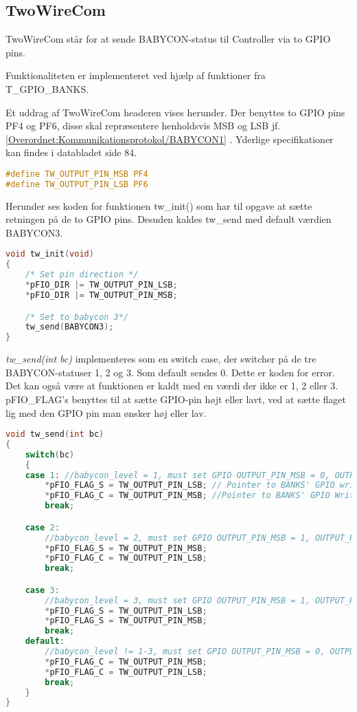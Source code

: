 \subsection*{TwoWireCom}
TwoWireCom står for at sende BABYCON-status til Controller via to GPIO pins. 

Funktionaliteten er implementeret ved hjælp af funktioner fra T\_GPIO\_BANKS. 

Et uddrag af TwoWireCom headeren vises herunder.
Der benyttes to GPIO pins PF4 og PF6, disse skal repræsentere henholdsvis MSB og LSB jf. \ref{Overordnet:Kommunikationsprotokol/BABYCON1} . Yderlige specifikationer kan findes i databladet \citep{AD1836} side 84. 

\begin{lstlisting}[language=C,numbers=none]
#define TW_OUTPUT_PIN_MSB PF4
#define TW_OUTPUT_PIN_LSB PF6
\end{lstlisting}

Herunder ses koden for funktionen tw\_init() som har til opgave at sætte retningen på de to GPIO pins. Desuden kaldes tw\_send med default værdien BABYCON3. 
\begin{lstlisting}[language=C,numbers=none]
void tw_init(void)
{
    /* Set pin direction */
    *pFIO_DIR |= TW_OUTPUT_PIN_LSB;
    *pFIO_DIR |= TW_OUTPUT_PIN_MSB;

    /* Set to babycon 3*/
    tw_send(BABYCON3);
}
\end{lstlisting}

\textit{tw\_send(int bc)} implementeres som en switch case, der switcher på de tre BABYCON-statuser 1, 2 og 3. Som default sendes 0. Dette er koden for error. Det kan også være at funktionen er kaldt med en værdi der ikke er 1, 2 eller 3.  
pFIO\_FLAG's benyttes til at sætte GPIO-pin højt eller lavt, ved at sætte flaget lig med den GPIO pin man ønsker høj eller lav. 

\begin{lstlisting}[language=C,numbers=none]
void tw_send(int bc)
{
    switch(bc)
    {
    case 1:	//babycon_level = 1, must set GPIO OUTPUT_PIN_MSB = 0, OUTPUT_PIN_LSB = 1.
        *pFIO_FLAG_S = TW_OUTPUT_PIN_LSB; // Pointer to BANKS' GPIO write to set register (Set high)
        *pFIO_FLAG_C = TW_OUTPUT_PIN_MSB; //Pointer to BANKS' GPIO Write to Clear register (set low)
        break;

    case 2:
        //babycon_level = 2, must set GPIO OUTPUT_PIN_MSB = 1, OUTPUT_PIN_LSB = 0.
        *pFIO_FLAG_S = TW_OUTPUT_PIN_MSB;
        *pFIO_FLAG_C = TW_OUTPUT_PIN_LSB;
        break;

    case 3:
        //babycon_level = 3, must set GPIO OUTPUT_PIN_MSB = 1, OUTPUT_PIN_LSB = 1.
        *pFIO_FLAG_S = TW_OUTPUT_PIN_LSB;
        *pFIO_FLAG_S = TW_OUTPUT_PIN_MSB;
        break;
    default:
        //babycon_level != 1-3, must set GPIO OUTPUT_PIN_MSB = 0, OUTPUT_PIN_LSB = 0 for error
        *pFIO_FLAG_C = TW_OUTPUT_PIN_MSB;
        *pFIO_FLAG_C = TW_OUTPUT_PIN_LSB;
        break;
    }
}
\end{lstlisting}